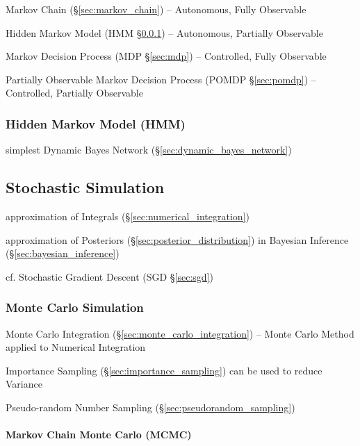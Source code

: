 Markov Chain (\S\ref{sec:markov_chain}) -- Autonomous, Fully Observable

Hidden Markov Model (HMM \S\ref{sec:hmm}) -- Autonomous, Partially Observable

Markov Decision Process (MDP \S\ref{sec:mdp}) -- Controlled, Fully Observable

Partially Observable Markov Decision Process (POMDP \S\ref{sec:pomdp}) --
Controlled, Partially Observable



\subsubsection{Hidden Markov Model (HMM)}\label{sec:hmm}

simplest Dynamic Bayes Network (\S\ref{sec:dynamic_bayes_network})



\subsection{Stochastic Simulation}\label{sec:stochastic_simulation}

approximation of Integrals (\S\ref{sec:numerical_integration})

approximation of Posteriors (\S\ref{sec:posterior_distribution}) in Bayesian
Inference (\S\ref{sec:bayesian_inference})

cf. Stochastic Gradient Descent (SGD \S\ref{sec:sgd})



\subsubsection{Monte Carlo Simulation}\label{sec:monte_carlo}

Monte Carlo Integration (\S\ref{sec:monte_carlo_integration}) -- Monte Carlo
Method applied to Numerical Integration

Importance Sampling (\S\ref{sec:importance_sampling}) can be used to reduce
Variance

Pseudo-random Number Sampling (\S\ref{sec:pseudorandom_sampling})



\paragraph{Markov Chain Monte Carlo (MCMC)}\label{sec:mcmc}\hfill

